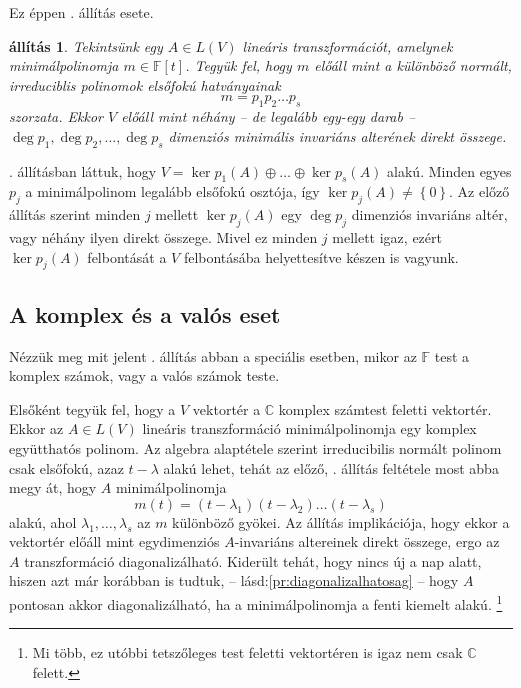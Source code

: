\documentclass[a4paper, showtrims]{memoir}
\makeatletter
\renewenvironment{proof}[1][\proofname]
    {\par\pushQED{\qed}%
    \normalfont \topsep6\p@\@plus6\p@\relax
    \trivlist
    \item[\hskip\labelsep
        \itshape
    #1\@addpunct{:}]\ignorespaces}
    {\popQED\endtrivlist\@endpefalse}
\theoremstyle{plain}
\newtheorem{proposition}{állítás}[chapter]
\theoremstyle{remark}
\theoremstyle{definition}
\makeatother
\begin{document}
Ez éppen . állítás esete.
\begin{proposition}\label{pr:minpolelsofokufelbontas}
	Tekintsünk egy $A\in L\left( V \right)$ lineáris transzformációt,
	amelynek minimálpolinomja $m\in\mathbb{F}\left[ t \right]$.
	Tegyük fel,
	hogy $m$ előáll mint a különböző normált, irreduciblis polinomok elsőfokú hatványainak
	\[
		m=p_1p_2\dots p_s
	\]
	szorzata.
	Ekkor $V$ előáll mint néhány -- de legalább egy-egy darab --
	$\deg p_1,\deg p_2,\ldots,\deg p_s$ dimenziós minimális invariáns alterének direkt összege.
\end{proposition}
\begin{proof}
    . állításban láttuk,
	hogy $V=\ker p_1\left( A \right)\oplus\ldots\oplus\ker p_s\left( A \right)$ alakú.
	Minden egyes $p_j$ a minimálpolinom legalább elsőfokú osztója, így $\ker p_j\left( A \right)\neq\left\{ 0 \right\}$.
	Az előző állítás szerint minden $j$ mellett $\ker p_j\left( A \right)$ egy $\deg p_j$
	dimenziós invariáns altér, vagy néhány ilyen direkt összege.
	Mivel ez minden $j$ mellett igaz, ezért $\ker p_j\left( A \right)$ felbontását a $V$ felbontásába helyettesítve készen is vagyunk.
\end{proof}
\subsection{A komplex és a valós eset}
Nézzük meg mit jelent . állítás abban a speciális esetben,
mikor az $\mathbb{F}$ test a komplex számok, vagy a valós számok teste.

Elsőként tegyük fel, hogy a $V$ vektortér a $\mathbb{C}$ komplex számtest feletti vektortér.
Ekkor az $A\in L\left( V \right)$ lineáris transzformáció minimálpolinomja egy komplex együtthatós polinom.
Az algebra alaptétele szerint irreducibilis normált polinom csak elsőfokú, azaz $t-\lambda$ alakú lehet,
tehát az előző, . állítás feltétele most abba megy át, hogy $A$ minimálpolinomja
\[
	m\left( t \right)=\left( t-\lambda_1 \right)\left( t-\lambda_2 \right)\dots\left( t-\lambda_s \right)
\]
alakú, ahol $\lambda_1,\ldots,\lambda_s$ az $m$ különböző gyökei.
Az állítás implikációja, hogy ekkor a vektortér előáll mint egydimenziós $A$-invariáns
altereinek direkt összege, ergo az $A$ transzformáció diagonalizálható.
Kiderült tehát, hogy nincs új a nap alatt, hiszen azt már korábban is tudtuk, -- lásd:\ref{pr:diagonalizalhatosag} -- hogy $A$ pontosan akkor diagonalizálható, ha a minimálpolinomja a fenti kiemelt alakú.%
\footnote{
    Mi több, ez utóbbi tetszőleges test feletti vektortéren is igaz nem csak $\mathbb{C}$ felett.
}
\end{document}
